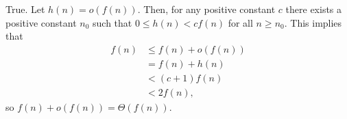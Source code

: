 True.
Let $h(n)=o(f(n))$.
Then, for any positive constant $c$ there exists a positive constant $n_0$ such that $0\le h(n)<cf(n)$ for all $n\ge n_0$.
This implies that
\begin{align*}
    f(n) &\le f(n)+o(f(n)) \\
    &= f(n)+h(n) \\
    &< (c+1)f(n) \\
    &< 2f(n),
\end{align*}
so $f(n)+o(f(n))=\Theta(f(n))$.
